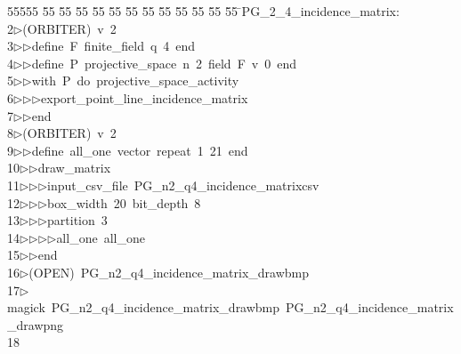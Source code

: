 %
%
\begin{tabbing}
55555 \= 55 \= 55 \= 55 \= 55 \= 55 \= 55 \= 55 \= 55 \= 55 \= 55 \= 55 \= 55 \= \>PG\_2\_4\_incidence\_matrix:\\[0pt]
2\>$\triangleright$\>(ORBITER)\ v\ 2\ \\[0pt]
3\>$\triangleright$\>$\triangleright$\>define\ F\ finite\_field\ q\ 4\ end\ \\[0pt]
4\>$\triangleright$\>$\triangleright$\>define\ P\ projective\_space\ n\ 2\ field\ F\ v\ 0\ end\ \\[0pt]
5\>$\triangleright$\>$\triangleright$\>with\ P\ do\ projective\_space\_activity\ \\[0pt]
6\>$\triangleright$\>$\triangleright$\>$\triangleright$\>export\_point\_line\_incidence\_matrix\ \\[0pt]
7\>$\triangleright$\>$\triangleright$\>end\\[0pt]
8\>$\triangleright$\>(ORBITER)\ v\ 2\ \\[0pt]
9\>$\triangleright$\>$\triangleright$\>define\ all\_one\ vector\ repeat\ 1\ 21\ end\ \\[0pt]
10\>$\triangleright$\>$\triangleright$\>draw\_matrix\ \\[0pt]
11\>$\triangleright$\>$\triangleright$\>$\triangleright$\>input\_csv\_file\ PG\_n2\_q4\_incidence\_matrixcsv\ \\[0pt]
12\>$\triangleright$\>$\triangleright$\>$\triangleright$\>box\_width\ 20\ bit\_depth\ 8\ \\[0pt]
13\>$\triangleright$\>$\triangleright$\>$\triangleright$\>partition\ 3\ \\[0pt]
14\>$\triangleright$\>$\triangleright$\>$\triangleright$\>$\triangleright$\>all\_one\ all\_one\ \\[0pt]
15\>$\triangleright$\>$\triangleright$\>end\\[0pt]
16\>$\triangleright$\>(OPEN)\ PG\_n2\_q4\_incidence\_matrix\_drawbmp\\[0pt]
17\>$\triangleright$\>magick\ PG\_n2\_q4\_incidence\_matrix\_drawbmp\ PG\_n2\_q4\_incidence\_matrix\_drawpng\\[0pt]
18\>\end{tabbing}
